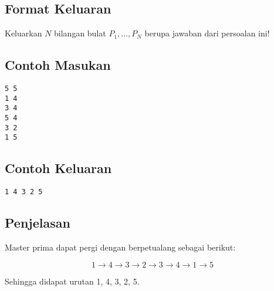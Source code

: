 \documentclass{article}
\begin{document}
\subsection*{Format Keluaran}

Keluarkan $N$ bilangan bulat $P_1, \dots, P_N$ berupa jawaban dari persoalan ini!
\\

\begin{multicols}{2}
\subsection*{Contoh Masukan}
\begin{lstlisting}
5 5
1 4
3 4
5 4
3 2
1 5
\end{lstlisting}
\columnbreak
\subsection*{Contoh Keluaran}
\begin{lstlisting}
1 4 3 2 5 
\end{lstlisting}
\vfill
\null
\end{multicols}

\subsection*{Penjelasan}

Master prima dapat pergi dengan berpetualang sebagai berikut:

$$1 \rightarrow 4 \rightarrow 3 \rightarrow 2 \rightarrow 3 \rightarrow 4 \rightarrow 1 \rightarrow 5$$

Sehingga didapat urutan 1, 4, 3, 2, 5.

\pagebreak
\end{document}
